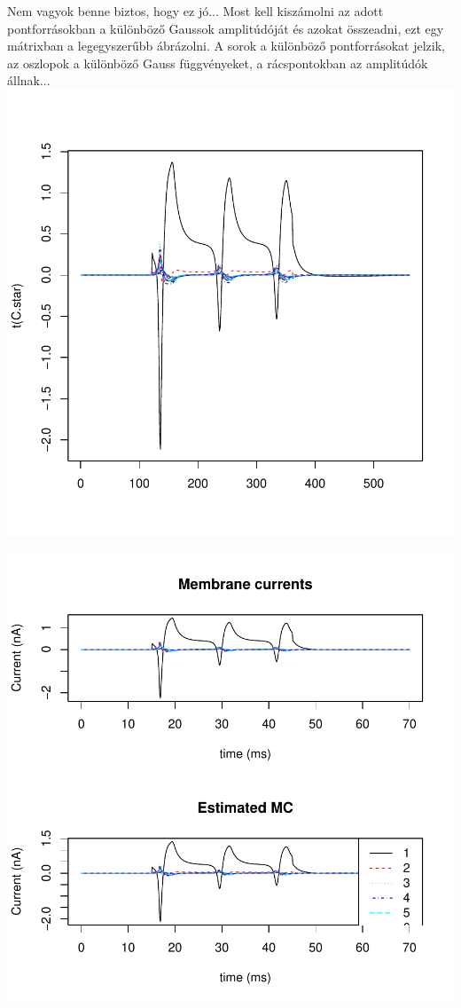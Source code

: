 \documentclass[10pt,a4paper]{report}
\begin{document}
Nem vagyok benne biztos, hogy ez jó...
Most kell kiszámolni az adott pontforrásokban a különböző Gaussok amplitúdóját és azokat összeadni, ezt egy mátrixban a legegyszerűbb ábrázolni. A sorok a különböző pontforrásokat jelzik, az oszlopok a különböző Gauss függvényeket, a rácspontokban az amplitúdók állnak...
\includegraphics{bs_1D_130506-Cstar}

\includegraphics{bs_1D_130506-membcurrentplot}
\end{document}
